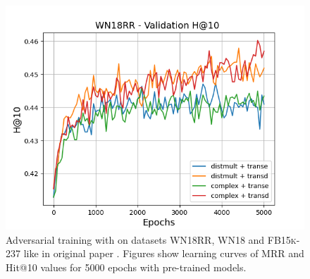 \begin{figure}
\begin{minipage}{.3\textwidth}
      \includegraphics[width=0.9\linewidth]{figures/results/gan_train/pretrained/uncertainty/max_distribution/entropy/wn18rr/gan_train_uncertainty_wn18rr_hit10s.png}
    \end{minipage}%
    \caption{Adversarial training with \ussoftmax on datasets \textsc{WN18RR}, \textsc{WN18} and \textsc{FB15k-237} like in original \kbgan paper \cite{cai2017kbgan}.
    Figures show learning curves of MRR and Hit@10 values for 5000 epochs with pre-trained models.}
    \label{fig:gan_train_pretrained_max_distribution}
\end{figure}